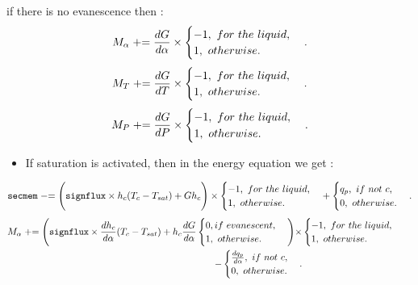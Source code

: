 if there is no evanescence then :
\begin{equation}
    M_\alpha \mathrel{+}= \frac{dG}{d\alpha}\times \begin{cases} -1,\ for\ the\ liquid, \\ 1,\ otherwise. \end{cases}.
\end{equation}
\begin{equation}
    M_T \pluseq \frac{dG}{dT}\times \begin{cases} -1,\ for\ the\ liquid, \\ 1,\ otherwise. \end{cases}.
\end{equation}
\begin{equation}
    M_P \pluseq \frac{dG}{dP}\times \begin{cases} -1,\ for\ the\ liquid, \\ 1,\ otherwise. \end{cases}.
\end{equation}
\begin{itemize}
    \item[\small \textcolor{blue}{\ding{109}}] If saturation is activated, then in the energy equation we get : 
\end{itemize}
\begin{equation}
    \texttt{secmem} \mathrel{-}= \Bigg(\texttt{signflux}\times h_c(T_c-T_{sat})+Gh_c\Bigg)\times \begin{cases} -1,\ for\ the\ liquid, \\ 1,\ otherwise. \end{cases} + \begin{cases} q_p,\ if\ not\ c, \\ 0,\ otherwise. \end{cases}.
\end{equation}
\begin{equation}
\begin{aligned}
    M_\alpha \mathrel{+}= \Bigg(\texttt{signflux}\times \frac{dh_c}{d\alpha}(T_c-T_{sat})+h_c\frac{dG}{d\alpha}\begin{cases} 0, if\ evanescent,\\ 1,\ otherwise. \end{cases}\Bigg)\times & \begin{cases} -1,\ for\ the\ liquid, \\ 1,\ otherwise. \end{cases} & \\- \begin{cases} \frac{dq_p}{d\alpha},\ if\ not\ c, \\ 0,\ otherwise. \end{cases}.
\end{aligned}
\end{equation}
